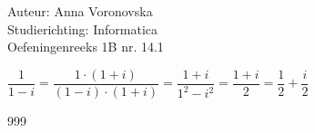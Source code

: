 \documentclass[a4paper]{article}
\begin{document}
  
\noindent \large Auteur: Anna Voronovska \\
\noindent \large Studierichting: Informatica\\
\noindent \large Oefeningenreeks 1B nr. 14.1\\

\medskip

\normalsize


$\dfrac{1}{1-i}=\dfrac{1 \cdot (1+i)}{(1-i) \cdot (1+i)}= \dfrac{1+i}{1^2-i^2} = \dfrac{1+i}{2}=\dfrac{1}{2}+ \dfrac{i}{2}$


\begin{thebibliography}{999}
\end{thebibliography}
\end{document}
